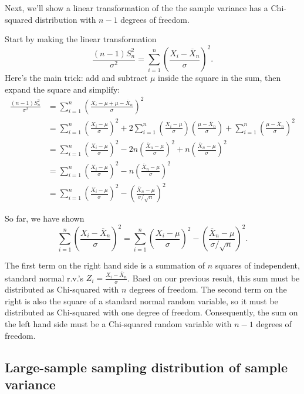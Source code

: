 \documentclass[
]{book}
\begin{document}
Next, we'll show a linear transformation of the the sample variance has a Chi-squared distribution with \(n-1\) degrees of freedom.

Start by making the linear transformation
\[\frac{(n-1)S_n^2}{\sigma^2} = \sum_{i=1}^n \left(\frac{X_i - \overline X_n}{\sigma}\right)^2.\]
Here's the main trick: add and subtract \(\mu\) inside the square in the sum, then expand the square and simplify:
\begin{align*}
\frac{(n-1)S_n^2}{\sigma^2} &= \sum_{i=1}^n \left(\frac{X_i - \mu + \mu - \overline X_n}{\sigma}\right)^2\\
& = \sum_{i=1}^n \left(\frac{X_i - \mu}{\sigma}\right)^2 + 2\sum_{i=1}^n \left(\frac{X_i - \mu}{\sigma}\right)\left(\frac{\mu - \overline X_n}{\sigma}\right) + \sum_{i=1}^n \left(\frac{\mu - \overline X_n}{\sigma}\right)^2\\
& = \sum_{i=1}^n \left(\frac{X_i - \mu}{\sigma}\right)^2 - 2n\left(\frac{\overline X_n - \mu}{\sigma}\right)^2 + n\left(\frac{\overline X_n - \mu}{\sigma}\right)^2\\
& = \sum_{i=1}^n \left(\frac{X_i - \mu}{\sigma}\right)^2 - n\left(\frac{\overline X_n - \mu}{\sigma}\right)^2\\
& = \sum_{i=1}^n \left(\frac{X_i - \mu}{\sigma}\right)^2 - \left(\frac{\overline X_n - \mu}{\sigma/\sqrt{n}}\right)^2
\end{align*}

So far, we have shown
\[\sum_{i=1}^n \left(\frac{X_i - \overline X_n}{\sigma}\right)^2 = \sum_{i=1}^n \left(\frac{X_i - \mu}{\sigma}\right)^2 - \left(\frac{\overline X_n - \mu}{\sigma/\sqrt{n}}\right)^2.\]

The first term on the right hand side is a summation of \(n\) squares of independent, standard normal r.v.'s \(Z_i = \frac{X_i - \overline X_n}{\sigma}\). Baed on our previous result, this sum must be distributed as Chi-squared with \(n\) degrees of freedom. The second term on the right is also the square of a standard normal random variable, so it must be distributed as Chi-squared with one degree of freedom. Consequently, the sum on the left hand side must be a Chi-squared random variable with \(n-1\) degrees of freedom.

\hypertarget{large-sample-sampling-distribution-of-sample-variance}{%
\subsection{Large-sample sampling distribution of sample variance}\label{large-sample-sampling-distribution-of-sample-variance}}
\end{document}
